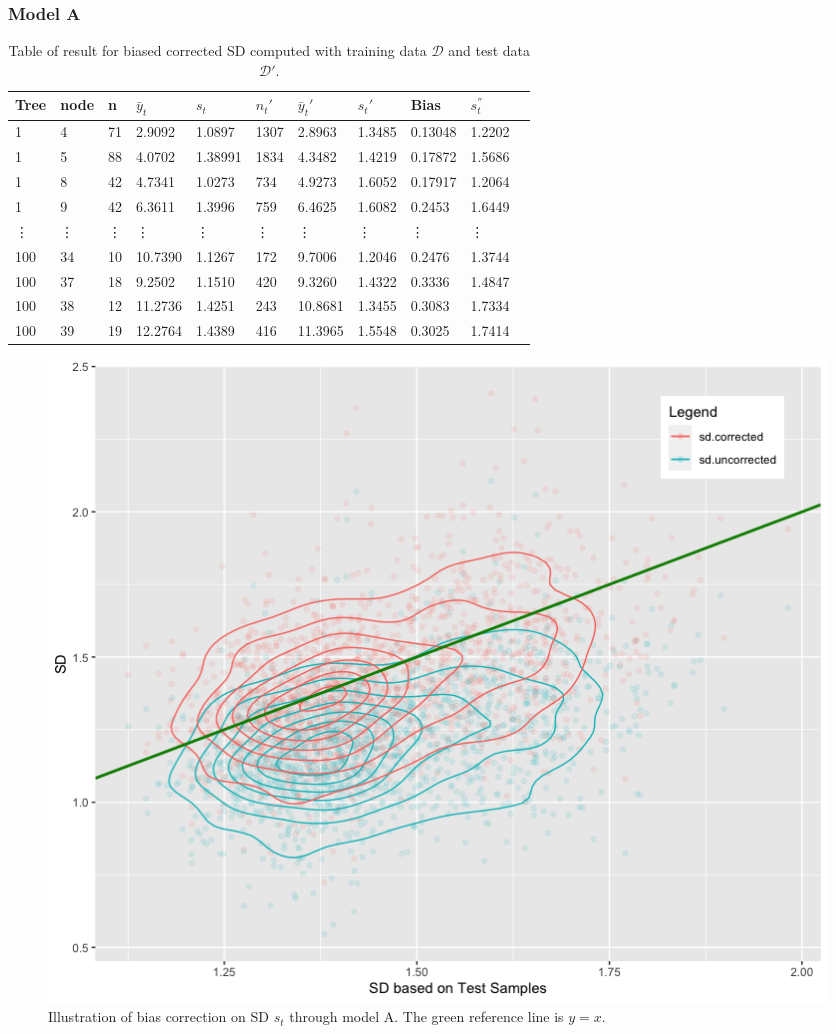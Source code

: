 \subsubsection{ Model A}
\vspace{0.1in}
\begin{table}[H]
	\caption{Table of result for biased corrected SD computed with training data $\mathcal{D}$ and test data $\mathcal{D}'$.  }
	\begin{tabular}{ |p{0.7cm}|p{0.8cm}|p{0.5cm}|p{1.4cm}|p{1.4cm}|p{1cm}|p{1.4cm}|p{1.5cm}|p{1.5cm}|p{1.5cm}|p{1.4cm}|}
		\hline
		Tree    &node  &n   &$\bar{y}_{t}$ &$s_t$ &$n_t'$ &$\bar{y}_{t}'$ & $s_t'$ &Bias &$s^{''}_t$\\
		\hline
		1&	4&	71&	2.9092&	1.0897&	1307&	2.8963&1.3485 &0.13048&1.2202\\

		1&	5&	88&	4.0702&	1.38991&	1834&	4.3482&1.4219&0.17872&1.5686\\
		1&	8&	42&	4.7341&	1.0273&	734&	4.9273&	1.6052&0.17917&1.2064\\
		1&	9&	42&	6.3611&	1.3996&	759&	6.4625&	1.6082& 0.2453&1.6449\\
		\vdots & \vdots & \vdots & \vdots & \vdots & \vdots  & \vdots &\vdots&\vdots&\vdots\\
		100	&34	&10&	10.7390&	1.1267&	172	&9.7006&	1.2046&0.2476	&1.3744\\
		100	&37	&18&	9.2502&	1.1510&	420&	9.3260&	1.4322&0.3336&	1.4847\\
		100	&38	&12&	11.2736&	1.4251&	243&	10.8681&	1.3455&0.3083&	1.7334\\
		100	&39&19&	12.2764&	1.4389&	416	&11.3965&	1.5548&0.3025&	1.7414\\
		\hline
	\end{tabular}
	\label{table:2}
\end{table}

\begin{figure}[H]
	\centering
	\includegraphics[scale=0.40, angle=0]{modA.png}
	\caption{Illustration of bias correction on SD $s_t$ through model A. The green reference line is $y=x$. 
		\label{fig02-bias-sdA}}
\end{figure}


